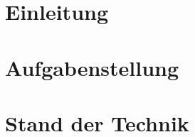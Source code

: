 \chapter{Einleitung}\label{cha:einleitung}



\chapter{Aufgabenstellung}\label{cha:aufgabe}



\chapter{Stand der Technik}\label{cha:stand}

